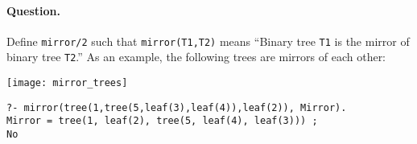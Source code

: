 \begin{multicols}{2}
\paragraph{Question.} Define \texttt{mirror/2} such that
\texttt{mirror(T1,T2)} means ``Binary tree \texttt{T1} is the mirror
of binary tree \texttt{T2}.'' As an example, the following trees are
mirrors of each other: \par\vfill\columnbreak
\begin{center}
\texttt{[image: mirror\_trees]}
\end{center}
\end{multicols}
\begin{verbatim}
?- mirror(tree(1,tree(5,leaf(3),leaf(4)),leaf(2)), Mirror).
Mirror = tree(1, leaf(2), tree(5, leaf(4), leaf(3))) ;
No
\end{verbatim}
